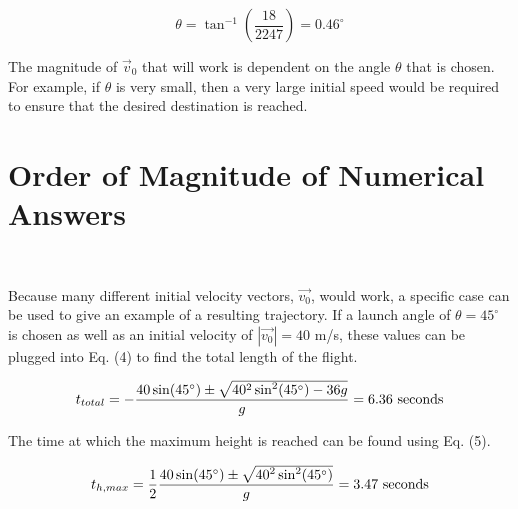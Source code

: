 \documentclass[11pt, oneside]{article}   	%
\begin{document}
\begin{equation}
\theta = \tan^{-1}(\frac{18}{2247}) = 0.46^{\circ}
\end{equation}

The magnitude of $\vec{v}_{0}$ that will work is dependent on the angle $\theta$ that is chosen. For example, if $\theta$ is very small, then a very large initial speed would be required to ensure that the desired destination is reached.

\section{Order of Magnitude of Numerical Answers}\

Because many different initial velocity vectors, $\vec{v_{0}}$, would work, a specific case can be used to give an example of a resulting trajectory. If a launch angle of $\theta = 45^{\circ}$ is chosen as well as an initial velocity of $|\vec{v_{0}}| = 40$ m/s, these values can be plugged into Eq. (4) to find the total length of the flight.

\begin{equation}
t_{total} = -\frac{40\sin(45^{\circ})\pm\sqrt{40^2\sin^{2}(45^{\circ})-36g}}{g} = 6.36 \textnormal{ seconds}
\end{equation}

%

%
%
%

The time at which the maximum height is reached can be found using Eq. (5).

\begin{equation}
t_{h,max} = \frac{1}{2} \frac{40\sin(45^{\circ})\pm\sqrt{{40}^2\sin^{2}(45^{\circ})}}{g} = 3.47 \textnormal{ seconds}
\end{equation}
\end{document}
